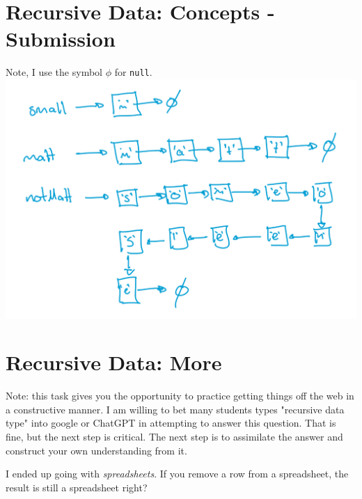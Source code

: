 \documentclass[twoside=false,DIV=14]{scrartcl}
\begin{document}
\section{Recursive Data: Concepts - Submission}

Note, I use the symbol $\phi$ for \lstinline|null|.\\
\includegraphics[width=\textwidth]{./week2_1.png}

\section{Recursive Data: More}
Note: this task gives you the opportunity to practice getting things off the web in a constructive manner.  I am willing to bet many students types "recursive data type" into google or ChatGPT in attempting to answer this question.  That is fine, but the next step is critical.  The next step is to assimilate the answer and construct your own understanding from it.
    
    I ended up going with \emph{spreadsheets}.  If you remove a row from a spreadsheet, the result is still a spreadsheet right?
\end{document}
